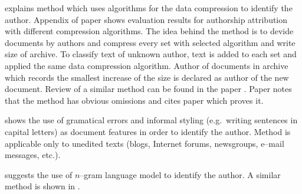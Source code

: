 \documentclass[11pt,english]{article}
\begin{document}
\begin{multicols}{2}
\citet{kukushkina2001using} explains method which uses algorithms for the data
compression to identify the author. Appendix of paper shows evaluation results
for authorship attribution with different compression algorithms. The idea behind
the method is to devide documents by authors and compress every set with selected
algorithm and write size of archive. To classify text of unknown author, text is
added to each set and applied the same data compression algorithm. Author of
documents in archive which records the smallest increase of the size is declared
as author of the new document. Review of a similar method can be found in the
paper \citep{zhao2005effective}. Paper notes that the method has obvious
omissions and cites paper which proves it.

\citet{koppel2003exploiting} shows the use of gramatical errors and informal
styling (e.g.\ writing sentences in capital letters) as document features in
order to identify the author. Method is applicable only to unedited texts (blogs,
Internet forums, newsgroups, e--mail messages, etc.).

\citet{peng2003language} suggests the use of $n$--gram language model to identify
the author. A similar method is shown in \citep{coyotl2006authorship}.


\end{multicols}
\end{document}
